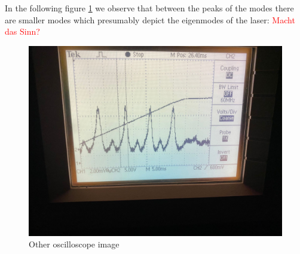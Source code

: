 \documentclass{article}
\begin{document}

In the following figure \ref{Eigenmoden_laser} we observe that between the peaks of the modes there are smaller modes which presumably depict the eigenmodes of the laser:
\textcolor{red}{Macht das Sinn?} \\

\begin{figure}[H]
\includegraphics[width=\textwidth]{oszilloskopbild_mit_eigenmoden_vom_laser.jpg}
\caption{Other oscilloscope image}
\label{Eigenmoden_laser}
\end{figure}
\end{document}

